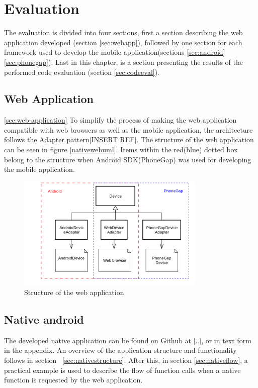 \chapter{Evaluation}	\label{ch:evaluation}
The evaluation is divided into four sections, first a section describing the web application developed (section \ref{sec:webapp}), followed by one section for each framework used to develop the mobile application(sections \ref{sec:android}\ref{sec:phonegap}). Last in this chapter, is a section presenting the results of the performed code evaluation (section \ref{sec:codeeval}).

\section{Web Application}\ref{sec:web-application}
To simplify the process of making the web application compatible with web browsers as well as the mobile application, the architecture follows the Adapter pattern[INSERT REF]. The structure of the web application can be seen in figure \ref{nativewebuml}. Items within the red(blue) dotted box belong to the structure when Android SDK(PhoneGap) was used for developing the mobile application.

\begin{figure}[h!]
	\centering
    \includegraphics[width=90mm,natwidth=600,natheight=450]{./img/webuml.png}
    \caption{Structure of the web application}
	\label{fig:webuml}
\end{figure}

\section{Native android} \label{sec:native-android}
The developed native application can be found on Github at [..], or in text form in the appendix. An overview of the application structure and functionality follows in section ~\ref{sec:nativestructure}. After this, in section \ref{sec:nativeflow}, a practical example is used to describe the flow of function calls when a native function is requested by the web application.

